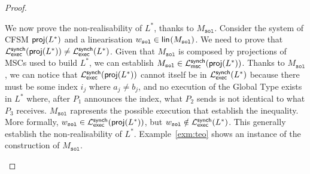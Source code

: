 \begin{proof}
\begin{itemize}
			We now prove the non-realisability of $L^*$, thanks to $M_{\texttt{sol}}$.
			Consider the system of CFSM $\mathsf{proj}(L^*)$ and a 
			linearisation $w_{\texttt{sol}}\in \mathsf{lin}_{}(M_{\texttt{sol}})$. 
			We need to prove that 	
			$\mathcal{L}_{\mathsf{exec}}^{\mathsf{synch}}(\mathsf{proj}(L^*))\neq\mathcal{L}_{\mathsf{exec}}^{\mathsf{synch}}(L^*)$.
			Given that $M_{\texttt{sol}}$ is composed by projections of MSCs 
			used to build $L^*$, we can establish 
			$M_{\texttt{sol}}\in\mathcal{L}_{\mathsf{msc}}^{\mathsf{synch}}(\mathsf{proj}(L^*))$.
			Thanks to $M_{\texttt{sol}}$, we can notice that 
			$\mathcal{L}_{\mathsf{exec}}^{\mathsf{synch}}(\mathsf{proj}(L^*))$ cannot 
			itself be in $\mathcal{L}_{\mathsf{exec}}^{\mathsf{synch}}(L^*)$ because there must be
			some index $i_j$ where $a_j \neq b_j$, and no execution of the Global 
			Type exists in $L^*$ where,
			after $P_1$ announces the index, what $P_2$ sends is not
			identical to what $P_3$ receives.
			$M_{\texttt{sol}}$ rapresents the possible execution 
			that establish the inequality. More formally, 
			$w_{\texttt{sol}} \in \mathcal{L}_{\mathsf{exec}}^{\mathsf{synch}}(\mathsf{proj}(L^*))$,
			but $w_{\texttt{sol}} \notin \mathcal{L}_{\mathsf{exec}}^{\mathsf{synch}}(L^*)$. 
			This generally establish the
			non-realisability of $L^*$. Example~\ref{exm:teo} shows an instance
			of the construction of $M_{\texttt{sol}}$.


\end{itemize}
\end{proof}
